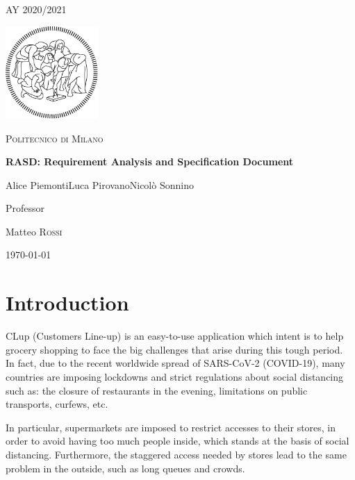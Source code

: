 \documentclass[12pt]{article}
\begin{document}
\begin{titlepage}
    \centering
    {\scshape\large AY 2020/2021 \par}
    \vfill
    \includegraphics[width=100pt]{assets/logo-polimi-new}\par\vspace{1cm}
    {\scshape\LARGE Politecnico di Milano \par}
    \vspace{1.5cm}
    {\huge\bfseries RASD\@: Requirement Analysis
        and Specification Document \par}
    \vspace{2cm}
    {\Large {Alice Piemonti\quad Luca Pirovano\quad Nicolò Sonnino}\par}
    \vfill
    {\large Professor\par
        Matteo \textsc{Rossi}}
    \vfill
    {\large \today \par}
\end{titlepage}
\thispagestyle{plain}
\mbox{}
\newpage
{}
\tableofcontents
\newpage
{}
\section{Introduction}
CLup (Customers Line-up) is an easy-to-use application which intent is to help grocery shopping to face the big challenges that arise during this tough period.\\

In fact, due to the recent worldwide spread of SARS-CoV-2 (COVID-19), many countries are imposing lockdowns and strict regulations about social distancing such as: the closure of restaurants in the evening, limitations on public transports, curfews, etc.

In particular, supermarkets are imposed to restrict accesses to their stores, in order to avoid having too much people inside, which stands at the basis of social distancing. Furthermore, the staggered access needed by stores lead to the same problem in the outside, such as long queues and crowds.
\end{document}
